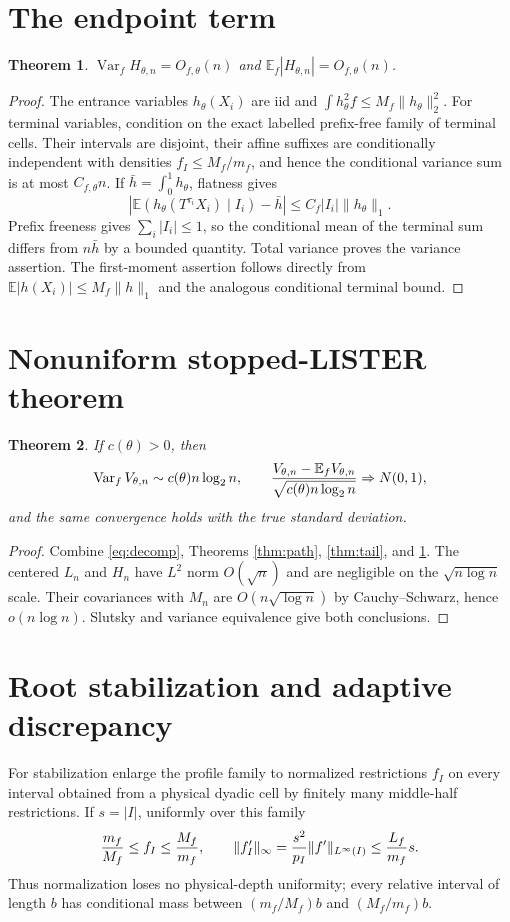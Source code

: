 \documentclass[11pt]{article}
\numberwithin{equation}{section}
\newtheorem{theorem}{Theorem}[section]
\newcommand{\E}{\mathbb E}\newcommand{\Pp}{\mathbb P}
\newcommand{\Var}{\operatorname{Var}}\newcommand{\Cov}{\operatorname{Cov}}
\newcommand{\1}{\mathbf 1}\newcommand{\F}{\mathcal F}\newcommand{\D}{\mathcal D}
\newcommand{\norm}[1]{\lVert#1\rVert}
\begin{document}
\section{The endpoint term}
\begin{theorem}\label{thm:endpoint}
$\Var_fH_{\theta,n}=O_{f,\theta}(n)$ and $\E_f|H_{\theta,n}|=O_{f,\theta}(n)$.
\end{theorem}
\begin{proof}
The entrance variables $h_\theta(X_i)$ are iid and
$\int h_\theta^2f\le M_f\norm{h_\theta}_2^2$.  For terminal variables,
condition on the exact labelled prefix-free family of terminal cells.
Their intervals are disjoint, their affine suffixes are conditionally
independent with densities $f_I\le M_f/m_f$, and hence the conditional
variance sum is at most $C_{f,\theta}n$.  If
$\bar h=\int_0^1h_\theta$, flatness gives
\[
 |\E(h_\theta(T^{\tau_i}X_i)\mid I_i)-\bar h|
 \le C_f|I_i|\norm{h_\theta}_1.
\]
Prefix freeness gives $\sum_i|I_i|\le1$, so the conditional mean of the
terminal sum differs from $n\bar h$ by a bounded quantity.  Total variance
proves the variance assertion.  The first-moment assertion follows directly
from $\E|h(X_i)|\le M_f\norm h_1$ and the analogous conditional terminal
bound.
\end{proof}

\section{Nonuniform stopped-LISTER theorem}
\begin{theorem}\label{thm:stopped}
If $c(\theta)>0$, then
\[
 \Var_fV_{\theta,n}\sim c(\theta)n\log_2n,\qquad
 {V_{\theta,n}-\E_fV_{\theta,n}\over\sqrt{c(\theta)n\log_2n}}
 \Rightarrow N(0,1),
\]
and the same convergence holds with the true standard deviation.
\end{theorem}
\begin{proof}
Combine \eqref{eq:decomp}, Theorems \ref{thm:path}, \ref{thm:tail}, and
\ref{thm:endpoint}.  The centered $L_n$ and $H_n$ have $L^2$ norm
$O(\sqrt n)$ and are negligible on the $\sqrt{n\log n}$ scale.  Their
covariances with $M_n$ are $O(n\sqrt{\log n})$ by Cauchy--Schwarz, hence
$o(n\log n)$.  Slutsky and variance equivalence give both conclusions.
\end{proof}

\section{Root stabilization and adaptive discrepancy}
For stabilization enlarge the profile family to normalized restrictions
$f_I$ on every interval obtained from a physical dyadic cell by finitely many
middle-half restrictions.  If $s=|I|$, uniformly over this family
\[
 {m_f\over M_f}\le f_I\le {M_f\over m_f},\qquad
 \|f_I'\|_\infty={s^2\over p_I}\|f'\|_{L^\infty(I)}
 \le {L_f\over m_f}s.
\]
Thus normalization loses no physical-depth uniformity; every relative
interval of length $b$ has conditional mass between $(m_f/M_f)b$ and
$(M_f/m_f)b$.
\end{document}
